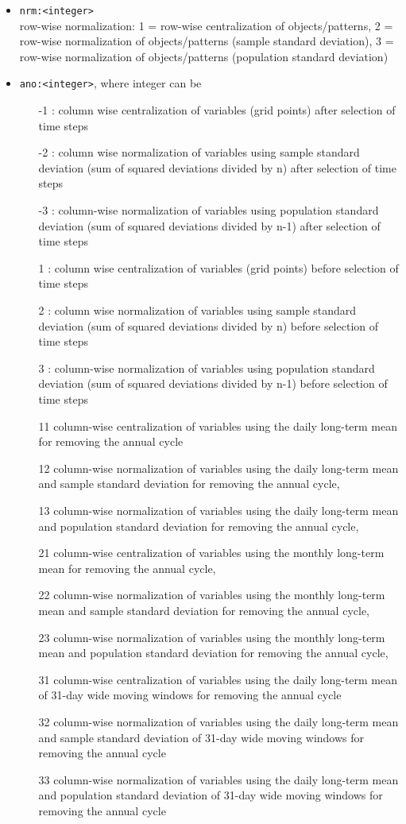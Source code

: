 \documentclass[12pt, oneside, a4paper, headsepline, plainheadsepline]{scrbook}
\begin{document}
\begin{itemize}
\item \verb+nrm:<integer>+ \\
		row-wise normalization: 
		1 = row-wise centralization of objects/patterns, 
		2 = row-wise normalization of objects/patterns (sample standard deviation), 
		3 = row-wise normalization of objects/patterns (population standard deviation)
		
\item \verb+ano:<integer>+, where integer can be 
\begin{itemize}
\item[-1]: column wise centralization of variables (grid points) after selection of time steps
\item[-2]: column wise normalization of variables using sample standard deviation (sum of squared deviations divided by n) after selection of time steps
\item[-3]: column-wise normalization of variables using population standard deviation (sum of squared deviations divided by n-1) after selection of time steps
\item[1]: column wise centralization of variables (grid points) before selection of time steps
\item[2]: column wise normalization of variables using sample standard deviation (sum of squared deviations divided by n) before selection of time steps
\item[3]: column-wise normalization of variables using population standard deviation (sum of squared deviations divided by n-1) before selection of time steps
\item[11] column-wise centralization of variables using the daily long-term mean for removing the annual cycle
\item[12] column-wise normalization of variables using the daily long-term mean and sample standard deviation for removing the annual cycle, 
\item[13]  column-wise normalization of variables using the daily long-term mean and population standard deviation for removing the annual cycle,
\item[21]  column-wise centralization of variables using the monthly long-term mean for removing the annual cycle, 
\item[22]  column-wise normalization of variables using the monthly long-term mean and sample standard deviation for removing the annual cycle, 
\item[23] column-wise normalization of variables using the monthly long-term mean and population standard deviation for removing the annual cycle,
\item[31] column-wise centralization of variables using the daily long-term mean of 31-day wide moving windows for removing the annual cycle
\item[32] column-wise normalization of variables using the daily long-term mean and sample standard deviation of 31-day wide moving windows for removing the annual cycle
\item[33]  column-wise normalization of variables using the daily long-term mean and population standard deviation of 31-day wide moving windows for removing the annual cycle
\end{itemize}


\end{itemize}
\end{document}
